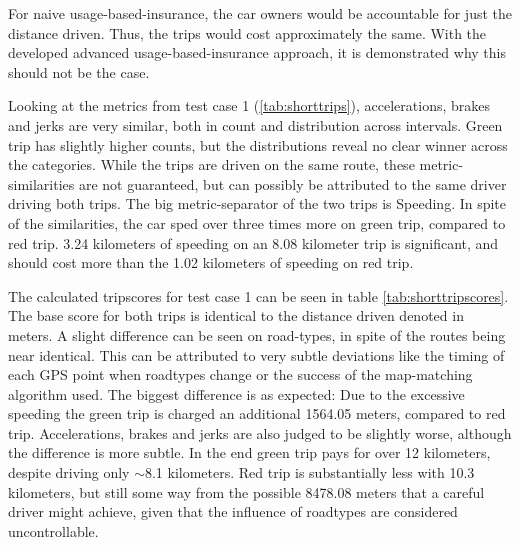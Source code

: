 For naive usage-based-insurance, the car owners would be accountable for just the distance driven. Thus, the trips would cost approximately the same. With the developed advanced usage-based-insurance approach, it is demonstrated why this should not be the case.

Looking at the metrics from test case 1 (\ref{tab:shorttrips}), accelerations, brakes and jerks are very similar, both in count and distribution across intervals. Green trip has slightly higher counts, but the distributions reveal no clear winner across the categories. While the trips are driven on the same route, these metric-similarities are not guaranteed, but can possibly be attributed to the same driver driving both trips. The big metric-separator of the two trips is Speeding. In spite of the similarities, the car sped over three times more on green trip, compared to red trip. 3.24 kilometers of speeding on an 8.08 kilometer trip is significant, and should cost more than the 1.02 kilometers of speeding on red trip.

The calculated tripscores for test case 1 can be seen in table \ref{tab:shorttripscores}. The base score for both trips is identical to the distance driven denoted in meters. A slight difference can be seen on road-types, in spite of the routes being near identical. This can be attributed to very subtle deviations like the timing of each GPS point when roadtypes change or the success of the map-matching algorithm used. The biggest difference is as expected: Due to the excessive speeding the green trip is charged an additional 1564.05 meters, compared to red trip. Accelerations, brakes and jerks are also judged to be slightly worse, although the difference is more subtle. In the end green trip pays for over 12 kilometers, despite driving only $\sim$8.1 kilometers. Red trip is substantially less with 10.3 kilometers, but still some way from the possible 8478.08 meters that a careful driver might achieve, given that the influence of roadtypes are considered uncontrollable.

